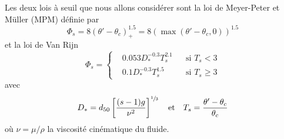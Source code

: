 \documentclass[11pt, a4paper, oneside]{report}
\begin{document}
Les deux lois à seuil que nous allons considérer sont la loi de Meyer-Peter et Müller (MPM) définie par
\begin{equation}
    \Phi_s = 8 \left( \theta' - \theta_c \right)_+^{1.5} = 8 \left( \max \left( \theta' - \theta_c, 0 \right) \right)^{1.5}
\end{equation}
et la loi de Van Rijn \cite{van1984sediment1}
\begin{equation}
    \Phi_s =
    \left \{
    \begin{aligned}
        & 0.053 D_*^{-0.3} T_s^{2.1}    &&\text{si } T_s < 3 \\
        & 0.1 D_*^{-0.3} T_s^{1.5}      &&\text{si } T_s \geq 3
    \end{aligned}
    \right .
\end{equation}
avec
\begin{equation}
    D_* = d_{50} \left[ \frac{(s-1) g}{\nu^2} \right]^{\sfrac{1}{3}} \quad \text{et} \quad T_s = \frac{\theta' - \theta_c}{\theta_c}
\end{equation}
où $\nu = \mu/\rho$ la viscosité cinématique du fluide.
\end{document}

